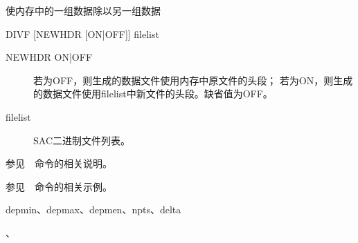 \label{cmd:divf}

使内存中的一组数据除以另一组数据

\begin{SACSTX}
DIVF [NEWHDR [ON|OFF]] filelist
\end{SACSTX}

\begin{description}
\item [NEWHDR ON|OFF] 若为OFF，则生成的数据文件使用内存中原文件的头段；
    若为ON，则生成的数据文件使用filelist中新文件的头段。缺省值为OFF。
\item [filelist] SAC二进制文件列表。
\end{description}

参见~~命令的相关说明。

参见~~命令的相关示例。

depmin、depmax、depmen、npts、delta

、

